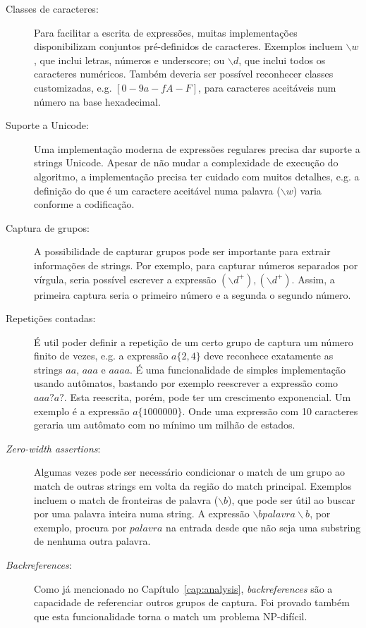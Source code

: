 \documentclass[a4paper,12pt,oneside,onecolumn]{uerj}
\begin{document}
\begin{description}
	\item[Classes de caracteres:] Para facilitar a escrita de expressões, muitas implementações disponibilizam conjuntos pré-definidos de caracteres. Exemplos incluem $\backslash w$, que inclui letras, números e underscore; ou $\backslash d$, que inclui todos os caracteres numéricos. Também deveria ser possível reconhecer classes customizadas, e.g. $[0-9a-fA-F]$, para caracteres aceitáveis num número na base hexadecimal.

	\item[Suporte a Unicode:] Uma implementação moderna de expressões regulares precisa dar suporte a strings Unicode. Apesar de não mudar a complexidade de execução do algoritmo, a implementação precisa ter cuidado com muitos detalhes, e.g. a definição do que é um caractere aceitável numa palavra ($\backslash w$) varia conforme a codificação.

	\item[Captura de grupos:] A possibilidade de capturar grupos pode ser importante para extrair informações de strings. Por exemplo, para capturar números separados por vírgula, seria possível escrever a expressão $(\backslash d^+),(\backslash d^+)$. Assim, a primeira captura seria o primeiro número e a segunda o segundo número.

	\item[Repetições contadas:] É util poder definir a repetição de um certo grupo de captura um número finito de vezes, e.g. a expressão $a\{2,4\}$ deve reconhece exatamente as strings $aa$, $aaa$ e $aaaa$. É uma funcionalidade de simples implementação usando autômatos, bastando por exemplo reescrever a expressão como $aaa?a?$. Esta reescrita, porém, pode ter um crescimento exponencial. Um exemplo é a expressão $a\{1000000\}$. Onde uma expressão com 10 caracteres geraria um autômato com no mínimo um milhão de estados.
	
	\item[\emph{Zero-width assertions}:] Algumas vezes pode ser necessário condicionar o match de um grupo ao match de outras strings em volta da região do match principal. Exemplos incluem o match de fronteiras de palavra ($\backslash b$), que pode ser útil ao buscar por uma palavra inteira numa string. A expressão $\backslash bpalavra\backslash b$, por exemplo, procura por $palavra$ na entrada desde que não seja uma substring de nenhuma outra palavra.
	
	\item[\emph{Backreferences}:] Como já mencionado no Capítulo~\ref{cap:analysis}, \emph{backreferences} são a capacidade de referenciar outros grupos de captura. Foi provado também que esta funcionalidade torna o match um problema NP-difícil.
		
\end{description}
\end{document}
